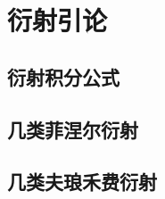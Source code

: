 

\section{衍射引论}\label{26-2}

\subsection{衍射积分公式}\label{26-2-1}

\subsection{几类菲涅尔衍射}\label{26-2-2}

\subsection{几类夫琅禾费衍射}\label{26-2-3}
